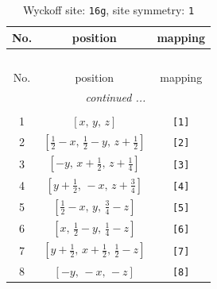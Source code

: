\documentclass[fleqn,8pt]{jsarticle}
\begin{document}
\renewcommand{\arraystretch}{1.2}
\begin{longtable}{ccc}
\caption{Wyckoff site: {\tt 16g}, site symmetry: {\tt 1}}
 \\
 \hline \hline
No. & position & mapping \\ \hline \endfirsthead

\multicolumn{2}{l}{\tablename\ \thetable{}} \\
 \hline \hline
No. & position & mapping \\ \hline \endhead

 \hline \hline
\multicolumn{2}{r}{\footnotesize\it continued ...} \\ \endfoot

 \hline \hline
\multicolumn{2}{r}{} \\ \endlastfoot

1 & $\left[ x,\, y,\, z \right]$ & {\tt [1]} \\ \hline
2 & $\left[ \frac{1}{2} - x,\, \frac{1}{2} - y,\, z + \frac{1}{2} \right]$ & {\tt [2]} \\ \hline
3 & $\left[ - y,\, x + \frac{1}{2},\, z + \frac{1}{4} \right]$ & {\tt [3]} \\ \hline
4 & $\left[ y + \frac{1}{2},\, - x,\, z + \frac{3}{4} \right]$ & {\tt [4]} \\ \hline
5 & $\left[ \frac{1}{2} - x,\, y,\, \frac{3}{4} - z \right]$ & {\tt [5]} \\ \hline
6 & $\left[ x,\, \frac{1}{2} - y,\, \frac{1}{4} - z \right]$ & {\tt [6]} \\ \hline
7 & $\left[ y + \frac{1}{2},\, x + \frac{1}{2},\, \frac{1}{2} - z \right]$ & {\tt [7]} \\ \hline
8 & $\left[ - y,\, - x,\, - z \right]$ & {\tt [8]} \\
\end{longtable}
\end{document}
